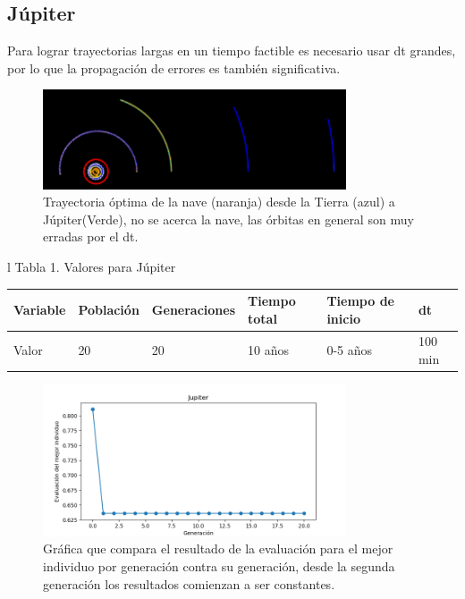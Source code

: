 \documentclass[12pt,letterpaper]{article}
\begin{document}
\subsection*{Júpiter}

Para lograr trayectorias largas en un tiempo factible es necesario usar dt grandes, por lo que la propagación de errores es también significativa.

\begin{figure}[H]
\centering
\includegraphics[width=0.8\textwidth]{jupiter}
\caption{Trayectoria óptima de la nave (naranja) desde la Tierra (azul) a Júpiter(Verde), no se acerca la nave, las órbitas en general son muy erradas por el dt.}
\end{figure}


\begin{tabular}{l}
Tabla 1. Valores para Júpiter \\
	\begin{tabular}{|l|l|l|l|l|l|}
	\hline
	Variable & Población & Generaciones & Tiempo total & Tiempo de inicio & dt \\	\hline 
	Valor & 20  & 20 & 10 años & 0-5 años & 100 min  \\ \hline
	\end{tabular}
\end{tabular}


\begin{figure}[H]
\centering
\includegraphics[width=0.8\textwidth]{Jupiterind}
\caption{Gráfica que compara el resultado de la evaluación para el mejor individuo por generación contra su generación, desde la segunda generación los resultados comienzan a ser constantes. }
\end{figure}
\end{document}
